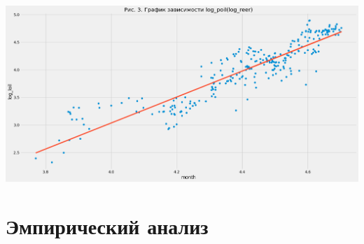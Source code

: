 \documentclass{article}
\begin{document}
\begin{center}
\includegraphics[width=150mm]{pics/log_reer_log_poil.png}
\end{center}

\section{Эмпирический анализ}
\end{document}

